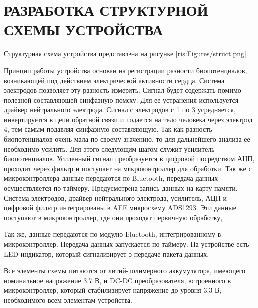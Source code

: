 \begin{sloppypar} %
\newpage %
\section{РАЗРАБОТКА СТРУКТУРНОЙ СХЕМЫ УСТРОЙСТВА} %
Структурная схема устройства представлена на рисунке \ref{ris:Figures/struct.png}.

Принцип работы устройства основан на регистрации разности биопотенциалов, возникающей под действием электрической активности сердца. Система электродов позволяет эту разность измерить. Сигнал будет содержать помимо полезной составляющей синфазную помеху. Для ее устранения используется драйвер нейтрального электрода. Сигнал с электродов с 1 по 3 усредняется, инвертируется в цепи обратной связи и подается на тело человека через электрод 4, тем самым подавляя синфазную составляющую. Так как разность биопотенциалов очень мала по своему значению, то для дальнейшего анализа ее необходимо усилить. Для этого следующим шагом служит усилитель биопотенциалов. Усиленный сигнал преобразуется в цифровой посредством АЦП, проходит через фильтр и поступает на микроконтроллер для обработки. Так же с микроконтроллера данные передаются по Bluetooth, передача данных осуществляется по таймеру. Предусмотрена запись данных на карту памяти. Система электродов, драйвер нейтрального электрода, усилитель, АЦП и цифровой фильтр интегрированы в AFE микросхему ADS1293.
Эти данные поступают в микроконтроллер, где они проходят первичную обработку, 

Так же, данные передаются по модулю Bluetooth, интегрированному в микроконтроллер. Передача данных запускается по таймеру. На устройстве есть LED-индикатор, который сигнализирует о передаче пакета данных. 

Все элементы схемы питаются от литий-полимерного аккумулятора, имеющего номинальное напряжение 3.7 В, и DC-DC преобразователя, встроенного в микроконтроллер, который стабилизирует напряжение до уровня 3.3 В, необходимого всем элементам устройства.

\end{sloppypar}
